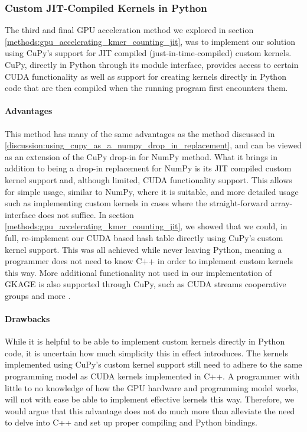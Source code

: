 \subsubsection{Custom JIT-Compiled Kernels in Python}
The third and final GPU acceleration method we explored in section \ref{methods:gpu_accelerating_kmer_counting_jit}, was to implement our solution using CuPy's support for JIT compiled (just-in-time-compiled) custom kernels.
CuPy, directly in Python through its module interface, provides access to certain CUDA functionality as well as support for creating kernels directly in Python code that are then compiled when the running program first encounters them.

\paragraph{Advantages}
This method has many of the same advantages as the method discussed in \ref{discussion:using_cupy_as_a_numpy_drop_in_replacement}, and can be viewed as an extension of the CuPy drop-in for NumPy method.
What it brings in addition to being a drop-in replacement for NumPy is its JIT compiled custom kernel support and, although limited, CUDA functionality support.
This allows for simple usage, similar to NumPy, where it is suitable, and more detailed usage such as implementing custom kernels in cases where the straight-forward array-interface does not suffice.
In section \ref{methods:gpu_accelerating_kmer_counting_jit}, we showed that we could, in full, re-implement our CUDA based hash table directly using CuPy's custom kernel support.
This was all achieved while never leaving Python, meaning a programmer does not need to know C++ in order to implement custom kernels this way.
More additional functionality not used in our implementation of GKAGE is also supported through CuPy, such as CUDA streams cooperative groups and more \cite{cupy}.

\paragraph{Drawbacks}
While it is helpful to be able to implement custom kernels directly in Python code, it is uncertain how much simplicity this in effect introduces.
The kernels implemented using CuPy's custom kernel support still need to adhere to the same programming model as CUDA kernels implemented in C++.
A programmer with little to no knowledge of how the GPU hardware and programming model works, will not with ease be able to implement effective kernels this way.
Therefore, we would argue that this advantage does not do much more than alleviate the need to delve into C++ and set up proper compiling and Python bindings.
